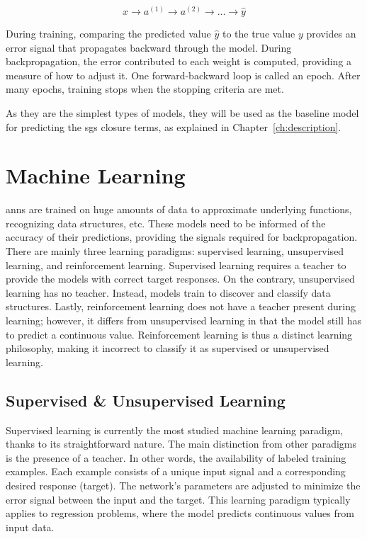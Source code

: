 \begin{equation*}
    x \rightarrow a^{(1)} \rightarrow a^{(2)} \rightarrow \ldots \rightarrow \hat{y}
\end{equation*}

During training, comparing the predicted value $\hat{y}$ to the true value $y$ provides an error signal that propagates backward through the model.
During backpropagation, the error contributed to each weight is computed, providing a measure of how to adjust it.
One forward-backward loop is called an epoch.
After many epochs, training stops when the stopping criteria are met.

As they are the simplest types of models, they will be used as the baseline model for predicting the \gls{sgs} closure terms, as explained in Chapter~\ref{ch:description}.

\section{Machine Learning} \label{sec:ml}


\gls{ann}s are trained on huge amounts of data to approximate underlying functions, recognizing data structures, etc.
These models need to be informed of the accuracy of their predictions, providing the signals required for backpropagation.
There are mainly three learning paradigms: supervised learning, unsupervised learning, and reinforcement learning.
Supervised learning requires a teacher to provide the models with correct target responses.
On the contrary, unsupervised learning has no teacher.
Instead, models train to discover and classify data structures.
Lastly, reinforcement learning does not have a teacher present during learning; however, it differs from unsupervised learning in that the model still has to predict a continuous value.
Reinforcement learning is thus a distinct learning philosophy, making it incorrect to classify it as supervised or unsupervised learning.

\subsection{Supervised \& Unsupervised Learning} \label{subsec:supervised}


Supervised learning is currently the most studied machine learning paradigm, thanks to its straightforward nature.
The main distinction from other paradigms is the presence of a teacher.
In other words, the availability of labeled training examples.
Each example consists of a unique input signal and a corresponding desired response (target).
The network's parameters are adjusted to minimize the error signal between the input and the target.
This learning paradigm typically applies to regression problems, where the model predicts continuous values from input data.

